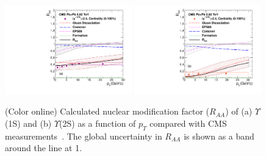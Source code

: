 {  

\begin{figure}
\includegraphics[width=0.49\textwidth]{Figures/Quarkonia_502TeV/Fig7a_Y1S_CMS_RAAPt_Shade.pdf}
\includegraphics[width=0.49\textwidth]{Figures/Quarkonia_502TeV/Fig7b_Y2S_CMS_RAAPt_Shade.pdf}
\caption{(Color online) Calculated nuclear modification factor ($R_{AA}$) \cite{Kumar:2019xdj}
  of (a) $\Upsilon$(1S) and 
  (b) $\Upsilon$(2S) as a function of $p_{T}$ 
  compared with CMS measurements~\cite{Sirunyan:2018nsz}.
The global uncertainty in $R_{AA}$ is shown as a band around the line at 1.
}
\label{fig:UpsilonRaaPtCMS}
\end{figure}



}
